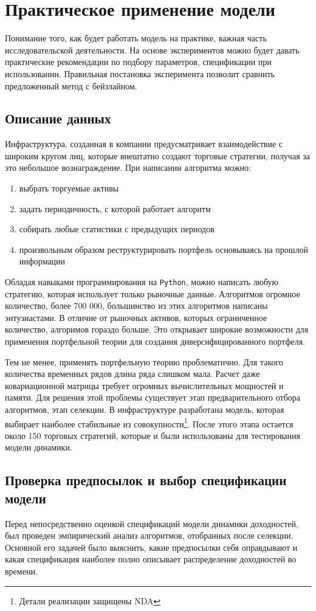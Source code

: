 \chapter{Практическое применение модели}
Понимание того, как будет работать модель на практике, важная часть исследовательской деятельности. На основе экспериментов можно будет давать практические рекомендации по подбору параметров, спецификации при использовании. Правильная постановка эксперимента позволит сравнить предложенный метод с бейзлайном.

\section{Описание данных}
Инфраструктура, созданная в компании предусматривает взаимодействие с широким кругом лиц, которые внештатно создают торговые стратегии, получая за это небольшое вознаграждение. При написании алгоритма можно:
\begin{enumerate}
	\item выбрать торгуемые активы
	\item задать периодичность, с которой работает алгоритм
	\item собирать любые статистики с предыдущих периодов
	\item произвольным образом реструктурировать портфель основываясь на прошлой информации
\end{enumerate}
Обладая навыками программирования на \texttt{Python}, можно написать любую стратегию, которая использует только рыночные данные. Алгоритмов огромное количество, более 700 000, большинство из этих алгоритмов написаны энтузиастами. В отличие от рыночных активов, которых ограниченное количество, алгоримов гораздо больше. Это открывает широкие возможности для применения портфельной теории для создания диверсифицированного портфеля.

Тем не менее, применять портфельную теорию проблематично. Для такого количества временных рядов длина ряда слишком мала. Расчет даже ковариационной матрицы требует огромных вычислительных мощностей и памяти. Для решения этой проблемы существует этап предварительного отбора алгоритмов, этап селекции. В инфраструктуре разработана модель, которая выбирает наиболее стабильные из совокупности\footnote{Детали реализации защищены NDA}. После этого этапа остается около 150 торговых стратегий, которые и были использованы для тестирования модели динамики.

\section{Проверка предпосылок и выбор спецификации модели}
Перед непосредственно оценкой спецификаций модели динамики доходностей, был проведен эмпирический анализ алгоритмов, отобранных после селекции. Основной его задачей было выяснить, какие предпосылки себя оправдывают и какая спецификация наиболее полно описывает распределение доходностей во времени. 

